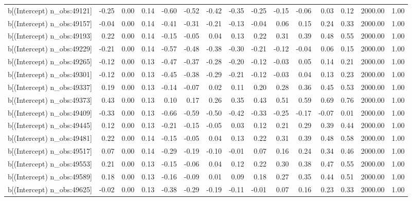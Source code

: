 \begin{table}[ht]
\begin{tabular}{rrrrrrrrrrrrrrr}
  b[(Intercept) n\_obs:49121] & -0.25 & 0.00 & 0.14 & -0.60 & -0.52 & -0.42 & -0.35 & -0.25 & -0.15 & -0.06 & 0.03 & 0.12 & 2000.00 & 1.00 \\ 
  b[(Intercept) n\_obs:49157] & -0.04 & 0.00 & 0.14 & -0.41 & -0.31 & -0.21 & -0.13 & -0.04 & 0.06 & 0.15 & 0.24 & 0.33 & 2000.00 & 1.00 \\ 
  b[(Intercept) n\_obs:49193] & 0.22 & 0.00 & 0.14 & -0.15 & -0.05 & 0.04 & 0.13 & 0.22 & 0.31 & 0.39 & 0.48 & 0.55 & 2000.00 & 1.00 \\ 
  b[(Intercept) n\_obs:49229] & -0.21 & 0.00 & 0.14 & -0.57 & -0.48 & -0.38 & -0.30 & -0.21 & -0.12 & -0.04 & 0.06 & 0.15 & 2000.00 & 1.00 \\ 
  b[(Intercept) n\_obs:49265] & -0.12 & 0.00 & 0.13 & -0.47 & -0.37 & -0.28 & -0.20 & -0.12 & -0.03 & 0.05 & 0.14 & 0.21 & 2000.00 & 1.00 \\ 
  b[(Intercept) n\_obs:49301] & -0.12 & 0.00 & 0.13 & -0.45 & -0.38 & -0.29 & -0.21 & -0.12 & -0.03 & 0.04 & 0.13 & 0.23 & 2000.00 & 1.00 \\ 
  b[(Intercept) n\_obs:49337] & 0.19 & 0.00 & 0.13 & -0.14 & -0.07 & 0.02 & 0.11 & 0.20 & 0.28 & 0.36 & 0.45 & 0.53 & 2000.00 & 1.00 \\ 
  b[(Intercept) n\_obs:49373] & 0.43 & 0.00 & 0.13 & 0.10 & 0.17 & 0.26 & 0.35 & 0.43 & 0.51 & 0.59 & 0.69 & 0.76 & 2000.00 & 1.00 \\ 
  b[(Intercept) n\_obs:49409] & -0.33 & 0.00 & 0.13 & -0.66 & -0.59 & -0.50 & -0.42 & -0.33 & -0.25 & -0.17 & -0.07 & 0.01 & 2000.00 & 1.00 \\ 
  b[(Intercept) n\_obs:49445] & 0.12 & 0.00 & 0.13 & -0.21 & -0.15 & -0.05 & 0.03 & 0.12 & 0.21 & 0.29 & 0.39 & 0.44 & 2000.00 & 1.00 \\ 
  b[(Intercept) n\_obs:49481] & 0.22 & 0.00 & 0.14 & -0.15 & -0.05 & 0.04 & 0.13 & 0.22 & 0.31 & 0.39 & 0.48 & 0.58 & 2000.00 & 1.00 \\ 
  b[(Intercept) n\_obs:49517] & 0.07 & 0.00 & 0.14 & -0.29 & -0.19 & -0.10 & -0.01 & 0.07 & 0.16 & 0.24 & 0.34 & 0.46 & 2000.00 & 1.00 \\ 
  b[(Intercept) n\_obs:49553] & 0.21 & 0.00 & 0.13 & -0.15 & -0.06 & 0.04 & 0.12 & 0.22 & 0.30 & 0.38 & 0.47 & 0.55 & 2000.00 & 1.00 \\ 
  b[(Intercept) n\_obs:49589] & 0.18 & 0.00 & 0.13 & -0.16 & -0.09 & 0.01 & 0.09 & 0.18 & 0.27 & 0.35 & 0.44 & 0.51 & 2000.00 & 1.00 \\ 
  b[(Intercept) n\_obs:49625] & -0.02 & 0.00 & 0.13 & -0.38 & -0.29 & -0.19 & -0.11 & -0.01 & 0.07 & 0.16 & 0.23 & 0.33 & 2000.00 & 1.00 \\ 

\end{tabular}
\end{table}
